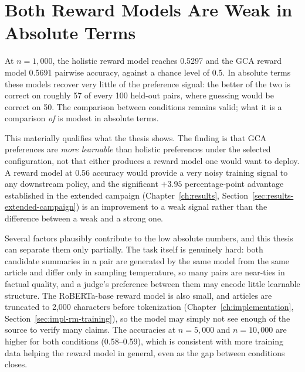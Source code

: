 \section{Both Reward Models Are Weak in Absolute Terms}
\label{sec:disc-weak-signal}

\begin{caveat}
At $n=1{,}000$, the holistic reward model reaches 0.5297 and the GCA reward
model 0.5691 pairwise accuracy, against a chance level of 0.5. In absolute
terms these models recover very little of the preference signal: the better
of the two is correct on roughly 57 of every 100 held-out pairs, where
guessing would be correct on 50. The comparison between conditions remains
valid; what it is a comparison \emph{of} is modest in absolute terms.
\end{caveat}

This materially qualifies what the thesis shows. The finding is that GCA
preferences are \emph{more learnable} than holistic preferences under the selected
configuration, not that either produces a reward model one would want to deploy.
A reward model at 0.56 accuracy would provide a very noisy training signal to any
downstream policy, and the significant $+3.95$ percentage-point advantage
established in the extended campaign (Chapter~\ref{ch:results},
Section~\ref{sec:results-extended-campaign}) is an improvement to a weak signal
rather than the difference between a weak and a strong one.

Several factors plausibly contribute to the low absolute numbers, and this thesis
can separate them only partially. The task itself is genuinely hard: both
candidate summaries in a pair are generated by the same model from the same
article and differ only in sampling temperature, so many pairs are near-ties in
factual quality, and a judge's preference between them may encode little
learnable structure. The RoBERTa-base reward model \citep{liu2019roberta} is also
small, and articles are truncated to 2{,}000 characters before tokenization
(Chapter~\ref{ch:implementation}, Section~\ref{sec:impl-rm-training}), so the model
may simply not see enough of the source to verify many claims. The accuracies at
$n=5{,}000$ and $n=10{,}000$ are higher for both conditions (0.58--0.59), which is
consistent with more training data helping the reward model in general, even as
the gap between conditions closes.

